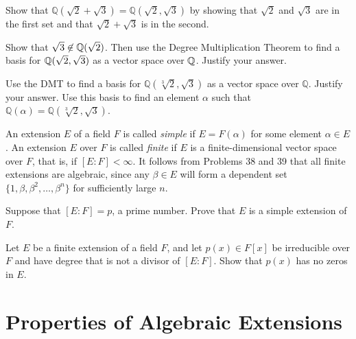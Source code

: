 \begin{problem}
Show that $\mathbb{Q}\left(\sqrt{2}+\sqrt{3}\right) = \mathbb{Q}\left(\sqrt{2}, \sqrt{3}\right)$ by showing that $\sqrt{2}$ and $\sqrt{3}$ are in the first set and that $\sqrt{2}+\sqrt{3}$ is in the second.
\end{problem}



\begin{problem}
    Show that $\sqrt{3}\not\in \mathbb{Q}(\sqrt{2})$. Then use the Degree Multiplication Theorem to find a basis for $\mathbb{Q}(\sqrt{2},\sqrt{3})$ as a vector space over $\mathbb{Q}$. Justify your answer.
\end{problem}



\begin{problem}
   Use the DMT to find  a basis for $\mathbb{Q}\left(\sqrt[3]{2},\sqrt{3}\right)$ as a vector space over $\mathbb{Q}$.  Justify your answer. Use this basis to find an element $\alpha$ such that $\mathbb{Q}(\alpha) = \mathbb{Q}\left(\sqrt[3]{2},\sqrt{3}\right)$.
\end{problem}



An extension $E$ of a field $F$ is called \textit{simple} if $E=F(\alpha)$ for some element $\alpha \in E$. An extension $E$ over $F$ is called \textit{finite} if $E$ is a finite-dimensional vector space over $F$, that is, if $[E:F]<\infty$. It follows from Problems 38 and 39 that all finite extensions are algebraic, since any $\beta\in E$ will form a dependent set $\{1, \beta, \beta^2, \ldots,\beta^n\}$ for sufficiently large $n$.

\begin{problem}
    Suppose that $[E:F]=p$, a prime number. Prove that $E$ is a simple extension of $F$.
\end{problem}



\begin{problem}
Let $E$ be a finite extension of a field $F$, and let $p(x) \in F[x]$ be irreducible over $F$ and have degree that is not a divisor of $[E:F]$.  Show that $p(x)$ has no zeros in $E$.
\end{problem}



\section{Properties of Algebraic Extensions}

